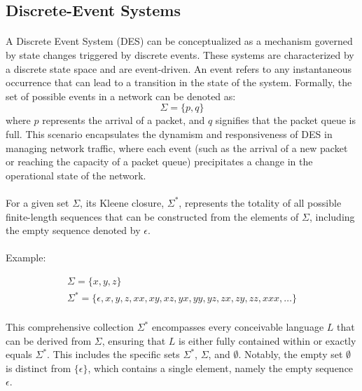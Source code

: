\subsection{Discrete-Event Systems}

\paragraph{} A Discrete Event System (DES) can be conceptualized as a mechanism governed by state changes triggered by discrete events. These systems are characterized by a discrete state space and are event-driven. An event refers to any instantaneous occurrence that can lead to a transition in the state of the system. Formally, the set of possible events in a network can be denoted as:
$$
\Sigma=\{p, q\}
$$
where \(p\) represents the arrival of a packet, and \(q\) signifies that the packet queue is full. This scenario encapsulates the dynamism and responsiveness of DES in managing network traffic, where each event (such as the arrival of a new packet or reaching the capacity of a packet queue) precipitates a change in the operational state of the network.

\paragraph{} For a given set \(\Sigma\), its Kleene closure, \(\Sigma^*\), represents the totality of all possible finite-length sequences that can be constructed from the elements of \(\Sigma\), including the empty sequence denoted by \(\epsilon\).

\paragraph{} Example:

\[
\begin{gathered}
\Sigma = \{x, y, z\} \\
\Sigma^* = \{\epsilon, x, y, z, xx, xy, xz, yx, yy, yz, zx, zy, zz, xxx, \ldots\}
\end{gathered}
\]

\paragraph{} This comprehensive collection \(\Sigma^*\) encompasses every conceivable language \(L\) that can be derived from \(\Sigma\), ensuring that \(L\) is either fully contained within or exactly equals \(\Sigma^*\). This includes the specific sets \(\Sigma^*\), \(\Sigma\), and \(\emptyset\). Notably, the empty set \(\emptyset\) is distinct from \(\{\epsilon\}\), which contains a single element, namely the empty sequence \(\epsilon\).

